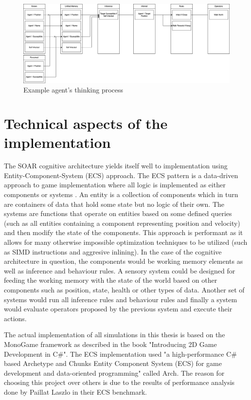 \begin{figure}[H]
    \centering
    \includegraphics[width=1.0\textwidth]{images/chapter1/agent_think.drawio.png}
    \caption{Example agent's thinking process}\label{fig:agent_think.drawio.png}
\end{figure}

\section{Technical aspects of the implementation}

The SOAR cognitive architecture yields itself well to implementation using Entity-Component-System (ECS) approach.
The ECS pattern is a data-driven approach to game implementation where all logic is implemented as either components or systems \cite{raffaillac2019polyphony}.
An entity is a collection of components which in turn are containers of data that hold some state but no logic of their own.
The systems are functions that operate on entities based on some defined queries (such as all entities containing a component representing position and velocity) and then modify the state of the components.
This approach is performant as it allows for many otherwise impossible optimization techniques to be utilized (such as SIMD instructions and aggresive inlining)\cite{harkonen2019advantages}.
In the case of the cognitive architecture in question, the components would be working memory elements as well as inference and behaviour rules.
A sensory system could be designed for feeding the working memory with the state of the world based on other components such as position, state, health or other types of data.
Another set of systems would run all inference rules and behaviour rules and finally a system would evaluate operators proposed by the previous system and execute their actions.

The actual implementation of all simulations in this thesis is based on the MonoGame framework as described in the book "Introducing 2D Game Development in C\#"\cite{pavleas2013introducing}.
The ECS implementation used "a high-performance C\# based Archetype and Chunks Entity Component System (ECS) for game development and data-oriented programming" called Arch\cite{matthaeus2023arch}.
The reason for choosing this project over others is due to the results of performance analysis done by Paillat Laszlo in their ECS benchmark\cite{laszlo2023arch}.

